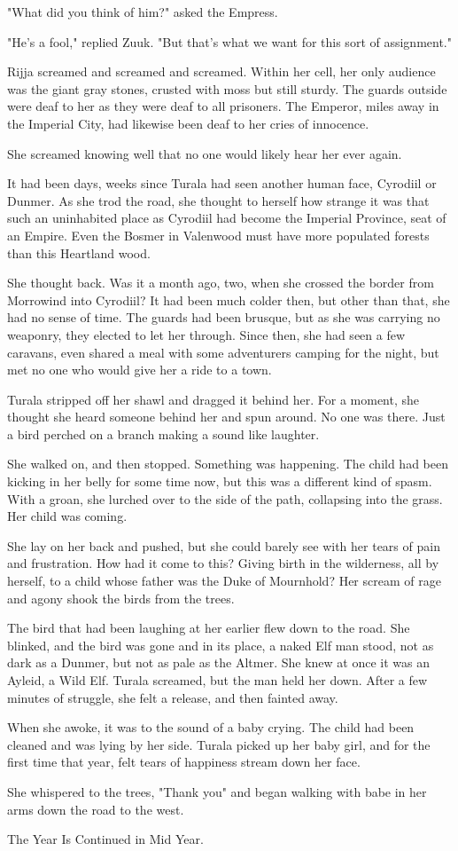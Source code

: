 "What did you think of him?" asked the Empress.

"He's a fool," replied Zuuk. "But that's what we want for this sort of assignment."

Rijja screamed and screamed and screamed. Within her cell, her only audience was the giant gray stones, crusted with moss but still sturdy. The guards outside were deaf to her as they were deaf to all prisoners. The Emperor, miles away in the Imperial City, had likewise been deaf to her cries of innocence.

She screamed knowing well that no one would likely hear her ever again.

It had been days, weeks since Turala had seen another human face, Cyrodiil or Dunmer. As she trod the road, she thought to herself how strange it was that such an uninhabited place as Cyrodiil had become the Imperial Province, seat of an Empire. Even the Bosmer in Valenwood must have more populated forests than this Heartland wood.

She thought back. Was it a month ago, two, when she crossed the border from Morrowind into Cyrodiil? It had been much colder then, but other than that, she had no sense of time. The guards had been brusque, but as she was carrying no weaponry, they elected to let her through. Since then, she had seen a few caravans, even shared a meal with some adventurers camping for the night, but met no one who would give her a ride to a town.

Turala stripped off her shawl and dragged it behind her. For a moment, she thought she heard someone behind her and spun around. No one was there. Just a bird perched on a branch making a sound like laughter.

She walked on, and then stopped. Something was happening. The child had been kicking in her belly for some time now, but this was a different kind of spasm. With a groan, she lurched over to the side of the path, collapsing into the grass. Her child was coming.

She lay on her back and pushed, but she could barely see with her tears of pain and frustration. How had it come to this? Giving birth in the wilderness, all by herself, to a child whose father was the Duke of Mournhold? Her scream of rage and agony shook the birds from the trees.

The bird that had been laughing at her earlier flew down to the road. She blinked, and the bird was gone and in its place, a naked Elf man stood, not as dark as a Dunmer, but not as pale as the Altmer. She knew at once it was an Ayleid, a Wild Elf. Turala screamed, but the man held her down. After a few minutes of struggle, she felt a release, and then fainted away.

When she awoke, it was to the sound of a baby crying. The child had been cleaned and was lying by her side. Turala picked up her baby girl, and for the first time that year, felt tears of happiness stream down her face.

She whispered to the trees, "Thank you" and began walking with babe in her arms down the road to the west.

The Year Is Continued in Mid Year.